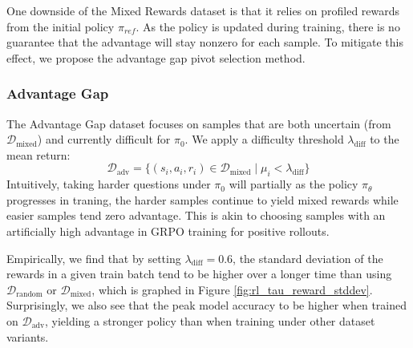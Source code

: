 One downside of the Mixed Rewards dataset is that it relies on profiled rewards from the initial policy $\pi_{ref}$. As the policy is updated during training, there is no guarantee that the advantage will stay nonzero for each sample. To mitigate this effect, we propose the advantage gap pivot selection method.

\subsubsection{Advantage Gap}
The Advantage Gap dataset focuses on samples that are both uncertain (from $\mathcal{D}_{\text{mixed}}$) and currently difficult for $\pi_0$. We apply a difficulty threshold $\lambda_{\text{diff}}$ to the mean return:
\begin{equation}
    \mathcal{D}_{\text{adv}} = \{ (s_i, a_i, r_i) \in \mathcal{D}_{\text{mixed}} \mid \mu_i < \lambda_{\text{diff}} \}
\end{equation}
Intuitively, taking harder questions under $\pi_0$ will partially as the policy $\pi_\theta$ progresses in traning, the harder samples continue to yield mixed rewards while easier samples tend zero advantage. This is akin to choosing samples with an artificially high advantage in GRPO training for positive rollouts.

Empirically, we find that by setting $\lambda_{\text{diff}} = 0.6$, the standard deviation of the rewards in a given train batch tend to be higher over a longer time than using $\mathcal{D}_{\text{random}}$ or $\mathcal{D}_{\text{mixed}}$, which is graphed in Figure \ref{fig:rl_tau_reward_stddev}. Surprisingly, we also see that the peak model accuracy to be higher when trained on $\mathcal{D}_{\text{adv}}$, yielding a stronger policy than when training under other dataset variants.